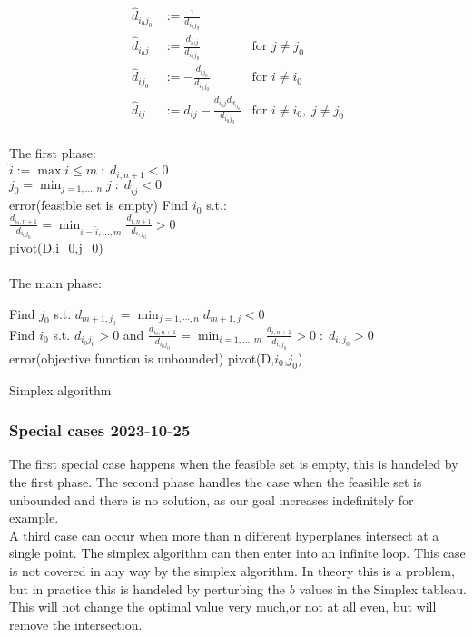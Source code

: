  \begin{equation}
    \begin{aligned}
        \hat{d}_{i_0j_0}&:=\frac{1}{d_{i_0j_9}}&\mbox{}\\[1.25ex]
        \hat{d}_{i_0j}&:= \frac{d_{i_0j}}{d_{i_0j_0}}&\mbox{for $j \neq j_0$}\\[1.25ex]
        \hat{d}_{ij_0}&:= -\frac{d_{ij_0}}{d_{i_0j_0}}&\mbox{for $i \neq i_0$}\\[1.25ex]
        \hat{d}_{ij}&:= d_{ij} - \frac{d_{i_0j}d_{d_{ij_0}}}{d_{i_0j_0}}&\mbox{for $i \neq i_0,\; j \neq j_0$}\\[1.25ex]
    \end{aligned} 
 \end{equation}
\begin{algorithm}[H]
\SetAlgoLined
\SetNoFillComment
{}
\vspace{3mm}
The first phase:\\
{
    $\hat{i} := \max{i \le m \; : \; d_{i,n+1} < 0}$\\
    $j_0 = \min_{j=1,\dots,n }{j \; : \; d_{\hat{i}j}<0}$\\
    {
    error(feasible set is empty)
    }
    Find $i_0$ s.t.:\\
$\frac{d_{i_0,n+1}}{d_{i_0j_0}} = \min_{i=\hat{i},\dots,m}\frac{d_{i,n+1}}{d_{i,j_0}}>0$\\
pivot(D,i_0,j_0)\\
}\\
The main phase:\\
{
    Find $j_0$ s.t. $d_{m+1,j_0} = \min_{j=1,\cdots ,n}{d_{m+1,j} < 0}$\\
    Find $i_0$ s.t. $d_{i_0j_0} > 0$ and $\frac{d_{i_0,n+1}}{d_{i_0j_0}} = \min_{i=1,\dots,m}{\frac{d_{i,n+1}}{d_{i,j_0}} > 0 \; : \;d_{i,j_0} > 0}$\\
    {error(objective function is unbounded)}
    pivot(D,$i_0$,$j_0$)

}
\Return 
\caption{Simplex algorithm}
\end{algorithm}
\subsubsection{Special cases 2023-10-25}
The first special case happens when the feasible set is empty, this is handeled by the first phase. The second phase handles the case when the feasible set is unbounded and there is no solution, as our goal increases indefinitely for example.\\
A third case can occur when more than n different hyperplanes intersect at a single point. The simplex algorithm can then enter into an infinite loop.
This case is not covered in any way by the simplex algorithm. In theory this is a problem, but in practice this is handeled by perturbing the $b$ values in the Simplex tableau. This will not change the optimal value very much,or not at all even, but will remove the intersection.

